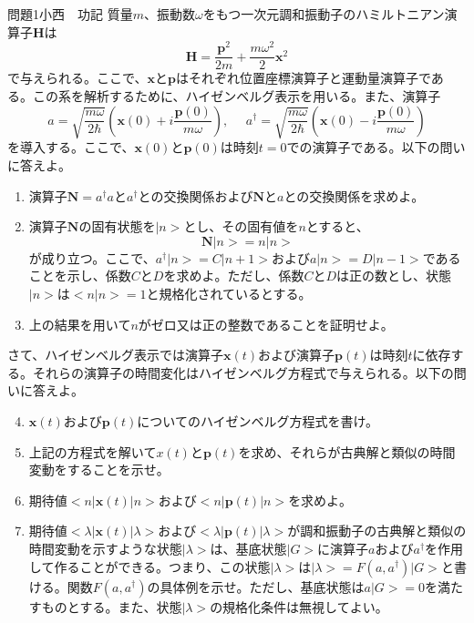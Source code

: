 \documentclass[fleqn]{jbook}
\begin{document}
\newcommand{\p}{\mathbf{p}} %
\newcommand{\x}{\mathbf{x}} %
\newcommand{\mH}{\mathbf{H}}
\newcommand{\mN}{\mathbf{N}}

\begin{question}{問題1}{小西　功記}
質量$m$、振動数$\omega$をもつ一次元調和振動子のハミルトニアン演算子$\mH$は
\[
\mH=\frac{\p^2}{2m}+\frac{m\omega^2}{2}\x^2
\]
で与えられる。ここで、$\x$と$\p$はそれぞれ位置座標演算子と運動量演算子である。この系を解析するために、ハイゼンベルグ表示を用いる。また、演算子
\[
a=\sqrt{\frac{m\omega}{2\hbar}} (\x(0)+i\frac{\p(0)}{m\omega}),\ \ \ \ \ \ a^\dagger=\sqrt{\frac{m\omega}{2\hbar}}(\x(0)-i\frac{\p(0)}{m\omega})
\]
を導入する。ここで、$\x(0)$と$\p(0)$は時刻$t=0$での演算子である。以下の問いに答えよ。
\begin{enumerate}
\item 演算子$\mN=a^\dagger a$と$a^\dagger$との交換関係および$\mN$と$a$との交換関係を求めよ。
\item 演算子$\mN$の固有状態を$|n>$とし、その固有値を$n$とすると、
  \[
    \mN|n>=n|n>
  \]
  が成り立つ。ここで、$a^\dagger|n>=C|n+1>$および$a|n>=D|n-1>$であることを示し、係数$CとD$を求めよ。ただし、係数$CとD$は正の数とし、状態$|n>$は$<n|n>=1$と規格化されているとする。
\item 上の結果を用いて$n$がゼロ又は正の整数であることを証明せよ。
\end{enumerate}
さて、ハイゼンベルグ表示では演算子$\x(t)$および演算子$\p(t)$は時刻$t$に依存する。それらの演算子の時間変化はハイゼンベルグ方程式で与えられる。以下の問いに答えよ。
\begin{enumerate}
\setcounter{enumi}{3}
\item $\x(t)$および$\p(t)$についてのハイゼンベルグ方程式を書け。
\item 上記の方程式を解いて$x(t)と\p(t)$を求め、それらが古典解と類似の時間変動をすることを示せ。
\item 期待値$<n|\x(t)|n>および<n|\p(t)|n>$を求めよ。
\item 期待値$<\lambda|\x(t)|\lambda>$および$<\lambda|\p(t)|\lambda>$が調和振動子の古典解と類似の時間変動を示すような状態$|\lambda>$は、基底状態$|G>$に演算子$aおよびa^\dagger$を作用して作ることができる。つまり、この状態$|\lambda>は|\lambda>=F(a,a^\dagger)|G>$と書ける。関数$F(a,a^\dagger)$の具体例を示せ。ただし、基底状態は$a|G>=0$を満たすものとする。また、状態$|\lambda>$の規格化条件は無視してよい。
\end{enumerate}
\end{question}
\newpage
\end{document}

